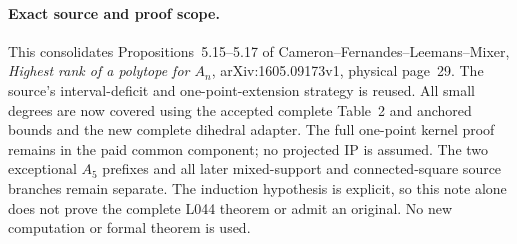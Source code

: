 \documentclass[10pt,a4paper]{article}
\begin{document}
\paragraph{Exact source and proof scope.}
This consolidates Propositions~5.15--5.17 of
Cameron--Fernandes--Leemans--Mixer, \emph{Highest rank of a
polytope for $A_n$}, arXiv:1605.09173v1, physical page~29.
The source's interval-deficit and one-point-extension strategy
is reused. All small degrees are now covered using the
accepted complete Table~2 and anchored bounds and the new
complete dihedral adapter. The full one-point kernel proof
remains in the paid common component; no projected IP is
assumed. The two exceptional $A_5$ prefixes and all later
mixed-support and connected-square source branches remain
separate. The induction hypothesis is explicit, so this note
alone does not prove the complete L044 theorem or admit an
original. No new computation or formal theorem is used.
\end{document}
